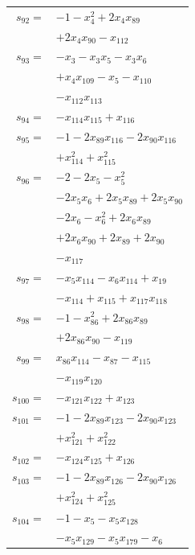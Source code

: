 \begin{longtable}{@{}r@{\;}l@{}}
\(s_{92}=\) & \(\displaystyle -1 -x_{4}^{2} +2x_{4}x_{89}\) \\
 & \(\displaystyle +2x_{4}x_{90} -x_{112}\) \\[3pt]
\(s_{93}=\) & \(\displaystyle -x_{3} -x_{3}x_{5} -x_{3}x_{6}\) \\
 & \(\displaystyle +x_{4}x_{109} -x_{5} -x_{110}\) \\
 & \(\displaystyle -x_{112}x_{113}\) \\[3pt]
\(s_{94}=\) & \(\displaystyle -x_{114}x_{115} +x_{116}\) \\[3pt]
\(s_{95}=\) & \(\displaystyle -1 -2x_{89}x_{116} -2x_{90}x_{116}\) \\
 & \(\displaystyle +x_{114}^{2} +x_{115}^{2}\) \\[3pt]
\(s_{96}=\) & \(\displaystyle -2 -2x_{5} -x_{5}^{2}\) \\
 & \(\displaystyle -2x_{5}x_{6} +2x_{5}x_{89} +2x_{5}x_{90}\) \\
 & \(\displaystyle -2x_{6} -x_{6}^{2} +2x_{6}x_{89}\) \\
 & \(\displaystyle +2x_{6}x_{90} +2x_{89} +2x_{90}\) \\
 & \(\displaystyle -x_{117}\) \\[3pt]
\(s_{97}=\) & \(\displaystyle -x_{5}x_{114} -x_{6}x_{114} +x_{19}\) \\
 & \(\displaystyle -x_{114} +x_{115} +x_{117}x_{118}\) \\[3pt]
\(s_{98}=\) & \(\displaystyle -1 -x_{86}^{2} +2x_{86}x_{89}\) \\
 & \(\displaystyle +2x_{86}x_{90} -x_{119}\) \\[3pt]
\(s_{99}=\) & \(\displaystyle x_{86}x_{114} -x_{87} -x_{115}\) \\
 & \(\displaystyle -x_{119}x_{120}\) \\[3pt]
\(s_{100}=\) & \(\displaystyle -x_{121}x_{122} +x_{123}\) \\[3pt]
\(s_{101}=\) & \(\displaystyle -1 -2x_{89}x_{123} -2x_{90}x_{123}\) \\
 & \(\displaystyle +x_{121}^{2} +x_{122}^{2}\) \\[3pt]
\(s_{102}=\) & \(\displaystyle -x_{124}x_{125} +x_{126}\) \\[3pt]
\(s_{103}=\) & \(\displaystyle -1 -2x_{89}x_{126} -2x_{90}x_{126}\) \\
 & \(\displaystyle +x_{124}^{2} +x_{125}^{2}\) \\[3pt]
\(s_{104}=\) & \(\displaystyle -1 -x_{5} -x_{5}x_{128}\) \\
 & \(\displaystyle -x_{5}x_{129} -x_{5}x_{179} -x_{6}\) \\

\end{longtable}
